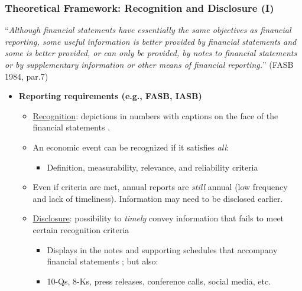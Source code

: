 \documentclass{beamer}
\begin{document}
\begin{frame}
\frametitle{Theoretical Framework: Recognition and Disclosure (I)}
\scriptsize ``\textit{Although financial statements have essentially the same objectives as financial reporting, some useful information is better provided by financial statements and some is better provided, or can only be provided, by notes to financial statements or by supplementary information or other means of financial reporting.}'' (FASB 1984, par.7)  \pause
\medskip

\normalsize
\begin{itemize}
\item \textbf{Reporting requirements (e.g., FASB, IASB)}

\begin{itemize}
	\item \underline{Recognition}: depictions in numbers with captions on the face of the financial statements \citep{schipperRequiredDisclosuresFinancial2007}. \pause
	\item An economic event can be recognized if it satisfies \textit{all}:
	\begin{itemize}
		\item Definition, measurability, relevance, and reliability criteria
		
	\end{itemize}
	
	
	\pause
	\item Even if criteria are met, annual reports are \textit{still} annual (low frequency and lack of timeliness). Information may need to be disclosed earlier. \pause
	\item \underline{Disclosure}: possibility to \textit{timely} convey information that fails to meet certain recognition criteria
	
	\begin{itemize}
		\item Displays in the notes and supporting schedules that accompany financial statements \citep{schipperRequiredDisclosuresFinancial2007}; but also:		
		\item 10-Qs, 8-Ks, press releases, conference calls, social media, etc.
	\end{itemize}	
	
	
\end{itemize}





\end{itemize}
\end{frame}
\end{document}
